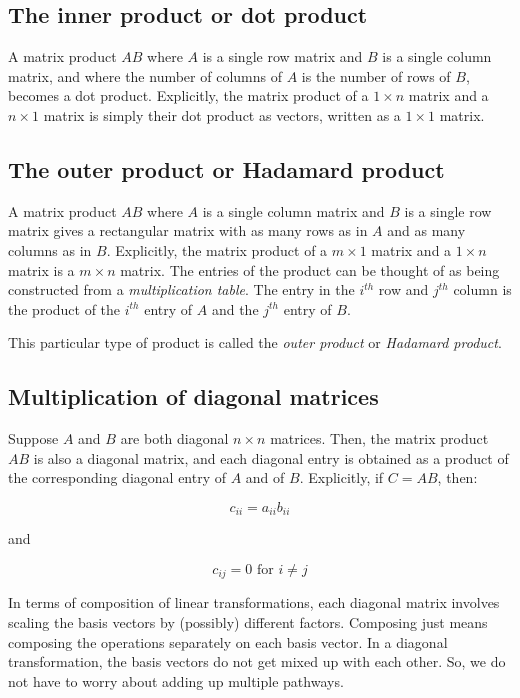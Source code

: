 \documentclass[10pt]{amsart}
\begin{document}
\subsection{The inner product or dot product}

A matrix product $AB$ where $A$ is a single row matrix and $B$ is a
single column matrix, and where the number of columns of $A$ is the
number of rows of $B$, becomes a dot product. Explicitly, the matrix
product of a $1 \times n$ matrix and a $n \times 1$ matrix is simply
their dot product as vectors, written as a $1 \times 1$ matrix.

\subsection{The outer product or Hadamard product}

A matrix product $AB$ where $A$ is a single column matrix and $B$ is a
single row matrix gives a rectangular matrix with as many rows as in
$A$ and as many columns as in $B$. Explicitly, the matrix product of a
$m \times 1$ matrix and a $1 \times n$ matrix is a $m \times n$
matrix. The entries of the product can be thought of as being
constructed from a {\em multiplication table}. The entry in the
$i^{th}$ row and $j^{th}$ column is the product of the $i^{th}$ entry
of $A$ and the $j^{th}$ entry of $B$.

This particular type of product is called the {\em outer product} or
{\em Hadamard product}.

\subsection{Multiplication of diagonal matrices}

Suppose $A$ and $B$ are both diagonal $n \times n$ matrices. Then, the
matrix product $AB$ is also a diagonal matrix, and each diagonal entry
is obtained as a product of the corresponding diagonal entry of $A$
and of $B$. Explicitly, if $C = AB$, then:

$$c_{ii} = a_{ii}b_{ii}$$

and

$$c_{ij} = 0 \text{ for } i \ne j$$

In terms of composition of linear transformations, each diagonal
matrix involves scaling the basis vectors by (possibly) different
factors. Composing just means composing the operations separately on
each basis vector. In a diagonal transformation, the basis vectors do
not get mixed up with each other. So, we do not have to worry about
adding up multiple pathways.
\end{document}
